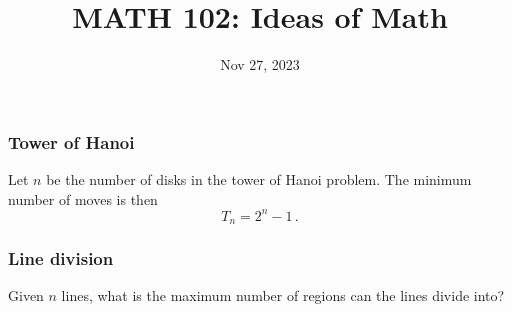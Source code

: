 \documentclass[aspectratio=169]{beamer}
\title{MATH 102: Ideas of Math}
\author{}
\date{Nov 27, 2023}
\begin{document}
\frame{\titlepage}

\begin{frame}
    \frametitle{ Tower of Hanoi }
    \begin{theorem}
       Let $n$ be the number of disks in the tower of Hanoi problem.
        The minimum number of moves is then
        $$T_n = 2^n -1 \,.$$
    \end{theorem}
\end{frame}


\begin{frame}
    \frametitle{ Line division }
    Given $n$ lines, what is the maximum number of regions can the lines divide into? 
\end{frame}
\end{document}
